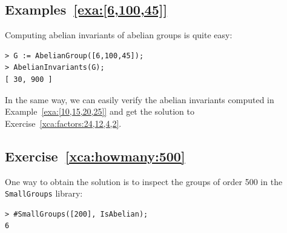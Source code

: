 \subsection*{Examples~\ref{exa:[6,100,45]}}

Computing abelian invariants of abelian groups is quite easy: 
\begin{lstlisting}
> G := AbelianGroup([6,100,45]);
> AbelianInvariants(G);
[ 30, 900 ]
\end{lstlisting}

In the same way, we can easily verify the abelian invariants computed in 
Example~\ref{exa:[10,15,20,25]} and get the 
solution to Exercise~\ref{xca:factors:24,12,4,2}.

\subsection*{Exercise~\ref{xca:howmany:500}}

One way to obtain the solution is to inspect the groups of order 500 in the 
\lstinline{SmallGroups} library:
\begin{lstlisting}
> #SmallGroups([200], IsAbelian);
6    
\end{lstlisting}

